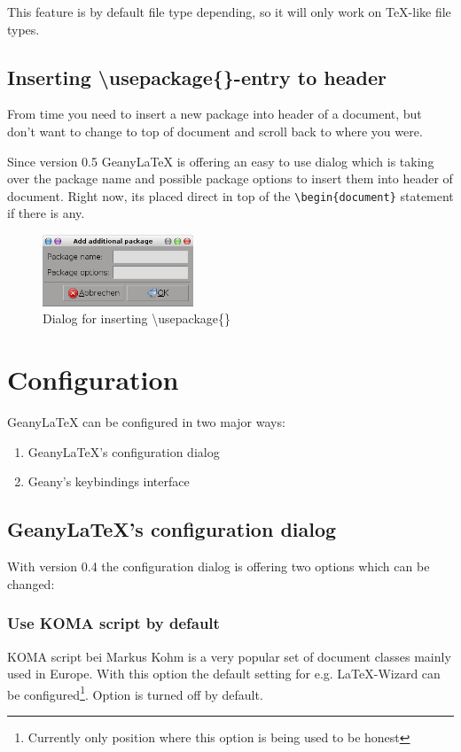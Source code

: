 \documentclass[%
paper=a4,%
fontsize=11pt,%
twoside=false,%
DIV18,
headsepline,
plainheadsepline,
footsepline,
plainfootsepline,
bibliography=totoc,%
listof=totoc,%
BCOR10mm,%
parskip=half,%
openany,%
]{scrartcl}
\begin{document}
This feature is by default file type depending, so it will only work
on \TeX{}-like file types.


\subsection{Inserting \textbackslash{}usepackage\{\}-entry to header}

From time you need to insert a new package into header of a document,
but don't want to change to top of document and scroll back to where you were.

Since version 0.5 Geany\LaTeX{} is offering an easy to use dialog
which is taking over the package name and possible package options to
insert them into header of document. Right now, its placed direct in
top of the \texttt{\textbackslash{}begin\{document\}} statement if
there is any.

\begin{figure}[ht]
	\centering
	\includegraphics[width=0.4\textwidth]{img/insert_usepackage.png}
	\caption{Dialog for inserting \textbackslash{}usepackage\{\}}
\end{figure}

\section{Configuration}

GeanyLaTeX{} can be configured in two major ways:
\begin{enumerate}
\item GeanyLaTeX{}'s configuration dialog
\item Geany's keybindings interface
\end{enumerate}

\subsection{GeanyLaTeX{}'s configuration dialog}
With version 0.4 the configuration dialog is offering two options which
can be changed:

\subsubsection{Use KOMA script by default}
KOMA script bei Markus Kohm is a very popular set of document classes
mainly used in Europe. With this option the default setting for e.g.
\LaTeX{}-Wizard can be configured\footnote{Currently only position where
this option is being used to be honest}. Option is turned off by default.
\end{document}
